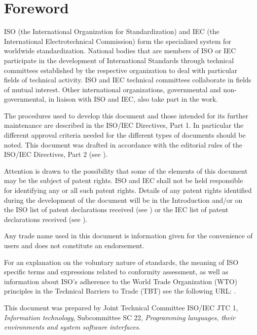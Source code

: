 \chapter{Foreword}

ISO (the International Organization for Standardization) and IEC (the
International Electrotechnical Commission) form the specialized system for
worldwide standardization. National bodies that are members of ISO or IEC
participate in the development of International Standards through technical
committees established by the respective organization to deal with particular
fields of technical activity. ISO and IEC technical committees collaborate in
fields of mutual interest. Other international organizations, governmental and
non-governmental, in liaison with ISO and IEC, also take part in the work.

The procedures used to develop this document and those intended for its further
maintenance are described in the ISO/IEC Directives, Part 1. In particular the
different approval criteria needed for the different types of documents should
be noted. This document was drafted in accordance with the editorial rules of
the ISO/IEC Directives, Part 2
(see \href{http://www.iso.org/directives}{}).

Attention is drawn to the possibility that some of the elements of this
document may be the subject of patent rights. ISO and IEC shall not be held
responsible for identifying any or all such patent rights. Details of any
patent rights identified during the development of the document will be in the
Introduction and/or on the ISO list of patent declarations received
(see \href{http://www.iso.org/patents}{})
or the IEC list of patent declarations received
(see \href{http://patents.iec.ch}{}).

Any trade name used in this document is information given for the convenience
of users and does not constitute an endorsement.

For an explanation on
the voluntary nature of standards,
the meaning of ISO specific terms and expressions related
to conformity assessment, as well as information about ISO's adherence
to the World Trade Organization (WTO) principles
in the Technical Barriers to Trade (TBT) see the following URL:
\href{http://www.iso.org/iso/foreword.html}{}.

This document was prepared by
Joint Technical Committee ISO/IEC JTC 1, \textit{Information technology},
Subcommittee SC 22, \textit{Programming languages, their environments and system software interfaces}.

